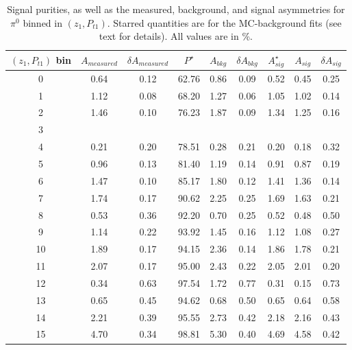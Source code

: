 \begin{table}[H]\footnotesize
\centering
\begin{tabular}{|c|c|c|c|c|c|c|c|c|}
 \hline
$(z_{1},P_{t1})$ bin & $A_{measured}$ & $\delta A_{measured}$ & $P^{\star}$ & $A_{bkg}$ & $\delta A_{bkg}$ & $A_{sig}^{\star}$ & $ A_{sig}$  & $\delta A_{sig}$ \\ \hline\hline
0 & 0.64 & 0.12 & 62.76 & 0.86 & 0.09 & 0.52 & 0.45 & 0.25 \\ \hline 
1 & 1.12 & 0.08 & 68.20 & 1.27 & 0.06 & 1.05 & 1.02 & 0.14 \\ \hline 
2 & 1.46 & 0.10 & 76.23 & 1.87 & 0.09 & 1.34 & 1.25 & 0.16 \\ \hline 
3 &  &  &  &  &  &  &  &  \\ \hline \hline
4 & 0.21 & 0.20 & 78.51 & 0.28 & 0.21 & 0.20 & 0.18 & 0.32 \\ \hline 
5 & 0.96 & 0.13 & 81.40 & 1.19 & 0.14 & 0.91 & 0.87 & 0.19 \\ \hline 
6 & 1.47 & 0.10 & 85.17 & 1.80 & 0.12 & 1.41 & 1.36 & 0.14 \\ \hline 
7 & 1.74 & 0.17 & 90.62 & 2.25 & 0.25 & 1.69 & 1.63 & 0.21 \\ \hline \hline
8 & 0.53 & 0.36 & 92.20 & 0.70 & 0.25 & 0.52 & 0.48 & 0.50 \\ \hline 
9 & 1.14 & 0.22 & 93.92 & 1.45 & 0.16 & 1.12 & 1.08 & 0.27 \\ \hline 
10 & 1.89 & 0.17 & 94.15 & 2.36 & 0.14 & 1.86 & 1.78 & 0.21 \\ \hline 
11 & 2.07 & 0.17 & 95.00 & 2.43 & 0.22 & 2.05 & 2.01 & 0.20 \\ \hline \hline
12 & 0.34 & 0.63 & 97.54 & 1.72 & 0.77 & 0.31 & 0.15 & 0.73 \\ \hline 
13 & 0.65 & 0.45 & 94.62 & 0.68 & 0.50 & 0.65 & 0.64 & 0.58 \\ \hline 
14 & 2.21 & 0.39 & 95.55 & 2.73 & 0.42 & 2.18 & 2.16 & 0.43 \\ \hline 
15 & 4.70 & 0.34 & 98.81 & 5.30 & 0.40 & 4.69 & 4.58 & 0.42 \\ \hline 
\end{tabular}
\caption[BG-correction quantities for $\pi^0$ asymmetries, $(z_{1},P_{t1})$ bins]{Signal purities, as well as the measured, background, and signal asymmetries for $\pi^0$ binned in $(z_{1},P_{t1})$. Starred quantities are for the MC-background fits (see text for details). All values are in \%.}
\label{tab:zptbkgcor}
\end{table}  

